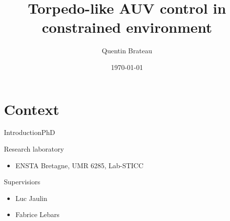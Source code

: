 \documentclass[10pt, xcolor={usenames, dvipsnames}]{beamer}
\title{Torpedo-like AUV control in constrained environment}
\date{\today}
\author{Quentin Brateau}
\institute{ENSTA Bretagne}
\begin{document}
    \maketitle


    \section{Context}

        \begin{frame}{Introduction}{PhD}
            \centering
            \begin{minipage}[c]{0.58\textwidth}
                \begin{block}{Research laboratory}
                    \vspace{0.2cm}
                    \begin{itemize}
                        \item ENSTA Bretagne, UMR 6285, Lab-STICC
                    \end{itemize}
                \end{block}

                \begin{block}{Supervisiors}
                    \begin{itemize}
                        \item Luc Jaulin
                        \item Fabrice Lebars
                    \end{itemize}
                \end{block}


\end{minipage}
\end{frame}
\end{document}
